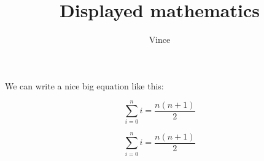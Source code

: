 \documentclass{article}
\title{Displayed mathematics}
\author{Vince}
\begin{document}
\maketitle

We can write a nice big equation like this:

$$
\sum_{i=0}^{n}i = \frac{n(n+1)}{2}
$$

\[
\sum_{i=0}^{n}i = \frac{n(n+1)}{2}
\]
\end{document}
